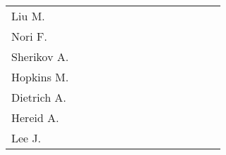 \begin{table*}[t]
\begin{tabular}{|l|c|c|c|c|c|c|c|c|c|c|c|c|c|}
		Liu M.				&
		& & & & & & & & & & & \cite{LiuM_IROS2015}	& \\
		Nori F.				&
		& & & & & & & & & & & \cite{Nori_FrontRobAI2015}	& \\
		Sherikov A.		&
		& & & & & & & & & & & \cite{Sherikov_Humanoids2015}	& \\
		Hopkins M.		&
		& & & & & & & & & & & \cite{Hopkins_ICRA2015}	& \cite{Hopkins_IJHR2016}	\\
		Dietrich A.		&
		& & & & & & & & & & & \cite{Dietrich_IJRR2015}	& \cite{Dietrich_ICRA2016}	\\
		Hereid A.			&
		& & & & & & & & & & & & \cite{Hereid_ICRA2016}	\\
		Lee J.				&
		& & & & & & & & & & & & \cite{LeeJ_ICRA2016}	\\
		\hline
	\end{tabular}
\end{table*}